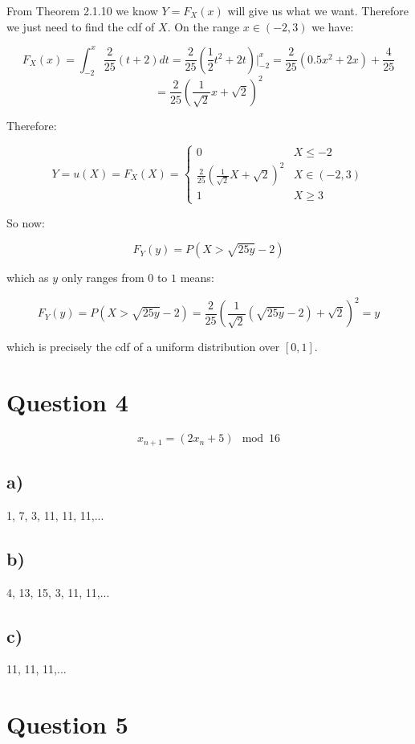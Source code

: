 \documentclass[11pt]{article}
\begin{document}
From Theorem 2.1.10 we know $Y=F_X(x)$ will give us what we want. Therefore we just need to find the cdf of $X$. On the range $x\in(-2, 3)$ we have:

$$F_X(x)=\int_{-2}^{x} \frac{2}{25}(t+2)dt=\frac{2}{25}\left(\frac{1}{2}t^2+2t\right)\Big|_{-2}^{x}=\frac{2}{25}(0.5x^2 + 2x) + \frac{4}{25}$$
$$=\frac{2}{25}(\frac{1}{\sqrt{2}}x+\sqrt{2})^2$$

Therefore:

\[
Y = u(X) = F_X(X) = 
\begin{cases}
    0 & X \leq -2 \\
    \frac{2}{25}(\frac{1}{\sqrt{2}}X+\sqrt{2})^2 & X \in (-2, 3) \\
    1 & X \geq 3
\end{cases}
\]

So now:

$$F_Y(y) = P\left(X > \sqrt{25y}-2\right)$$ 

which as $y$ only ranges from $0$ to $1$ means:

$$F_Y(y) = P\left(X > \sqrt{25y}-2\right)=\frac{2}{25}(\frac{1}{\sqrt{2}}(\sqrt{25y}-2)+\sqrt{2})^2=y$$

which is precisely the cdf of a uniform distribution over $[0, 1]$.  

\section*{Question 4}

$$x_{n+1} = (2x_n + 5) \mod 16$$

\subsection*{a)}

1, 7, 3, 11, 11, 11,... 

\subsection*{b)}

4, 13, 15, 3, 11, 11,... 

\subsection*{c)}

11, 11, 11,...

\section*{Question 5}
\end{document}
